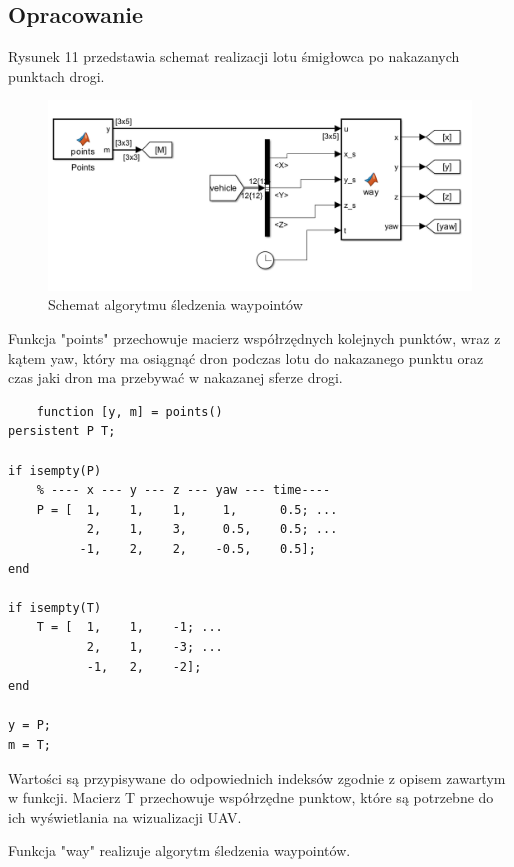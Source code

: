 \documentclass[polish,11pt,a4paper]{article}
\begin{document}
\subsection*{Opracowanie}
Rysunek 11 przedstawia schemat realizacji lotu śmigłowca po nakazanych punktach drogi.

\begin{figure}[ht]
    \centering
    \includegraphics[width=1\linewidth]{nakazane/nakaz-sch.png}
    \caption{Schemat algorytmu śledzenia waypointów}
    \label{fig:enter-label}

\end{figure}

Funkcja "points" przechowuje macierz współrzędnych kolejnych punktów, wraz z kątem yaw, który 
ma osiągnąć dron podczas lotu do nakazanego punktu oraz czas jaki dron ma przebywać w nakazanej sferze
drogi. 

\begin{verbatim}
    function [y, m] = points()
persistent P T;

if isempty(P)
    % ---- x --- y --- z --- yaw --- time----
    P = [  1,    1,    1,     1,      0.5; ...
           2,    1,    3,     0.5,    0.5; ...
          -1,    2,    2,    -0.5,    0.5];
end

if isempty(T)
    T = [  1,    1,    -1; ...
           2,    1,    -3; ...
           -1,   2,    -2];
end

y = P;
m = T;
\end{verbatim}

Wartości są przypisywane do odpowiednich indeksów zgodnie z opisem zawartym w funkcji. Macierz T
przechowuje współrzędne punktow, które są potrzebne do ich wyświetlania na wizualizacji UAV. 

Funkcja "way" realizuje algorytm śledzenia waypointów.
\end{document}

